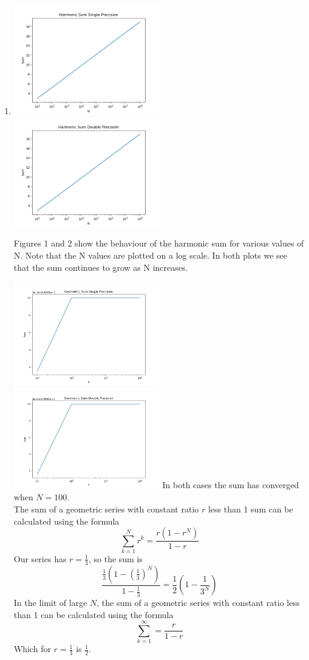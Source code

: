 \documentclass[letterpaper,12pt]{article} %
\begin{document}
\begin{enumerate}

  \item {
    \includegraphics[width=0.5\textwidth]{hsumsingle.png}
    \includegraphics[width=0.5\textwidth]{hsumdouble.png}

    Figures 1 and 2 show the behaviour of the harmonic sum for various values of N. Note that the N values are plotted on a log scale. In both plots we see that the sum continues to grow as N increases.

    \includegraphics[width=0.5\textwidth]{geosumsingle}
    \includegraphics[width=0.5\textwidth]{geosumdouble}
    In both cases the sum has converged when \(N = 100\).\\
    The sum of a geometric series with constant ratio \(r\) less than 1 sum can be calculated using the formula\cite{geoseries}
    \[ \sum_{k=1}^{N} r^k = \frac{r(1-r^N)}{1-r} \]
    Our series has \(r = \frac{1}{3}\), so the sum is
    \[ \frac{\frac{1}{3}(1-(\frac{1}{3})^N)}{1-\frac{1}{3}} = \frac{1}{2}(1-\frac{1}{3^N}) \]
    In the limit of large \(N\), the sum of a geometric series with constant ratio less than 1 can be calculated using the formula\cite{geoseries}
    \[ \sum_{k=1}^{\infty} = \frac{r}{1-r} \]
    Which for \(r = \frac{1}{3} \) is \(\frac{1}{2}\).
  }


\end{enumerate}
\end{document}
